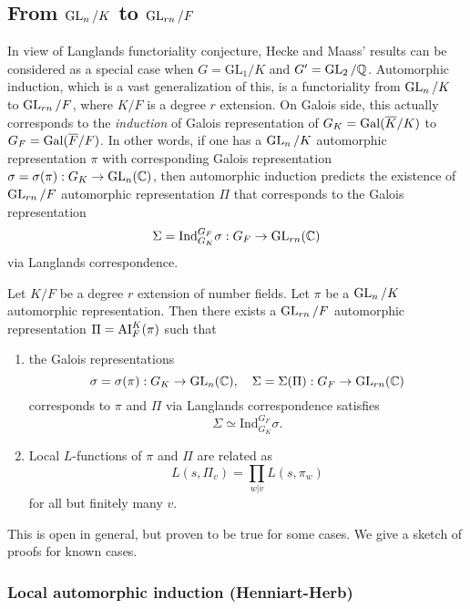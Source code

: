 \subsection{From $\operatorname{\mathrm{GL}}_{n}/K$ to $\operatorname{\mathrm{GL}}_{rn}/F$}
In view of Langlands functoriality conjecture, Hecke and Maass' results can be considered as a special case when $G = \mathrm{GL}_{1} / K$ and $G' = \operatorname{\mathrm{GL}}_{2}/\mathbb{Q}$. 
Automorphic induction, which is a vast generalization of this, is a functoriality from $\operatorname{\mathrm{GL}}_{n}/K$ to $\operatorname{\mathrm{GL}}_{rn}/F$, where $K/F$ is a degree $r$ extension.
On Galois side, this actually corresponds to the \emph{induction} of Galois representation of $G_{K} = \operatorname{\mathrm{Gal}}(\overline{K}/K)$ to $G_{F} = \operatorname{\mathrm{Gal}}(\overline{F}/F)$.
In other words, if one has a $\operatorname{\mathrm{GL}}_{n}/K$ automorphic representation $\pi$ with corresponding Galois representation $\sigma = \sigma(\pi): G_{K} \to \operatorname{\mathrm{GL}}_{n}(\mathbb{C})$, 
then automorphic induction predicts the existence of $\operatorname{\mathrm{GL}}_{rn}/F$ automorphic representation $\Pi$ that corresponds to the Galois representation
$$
\Sigma = \mathrm{Ind}_{G_{K}}^{G_{F}} \sigma : G_{F} \to \operatorname{\mathrm{GL}}_{rn}(\mathbb{C})
$$
via Langlands correspondence.

\begin{conjecture}
Let $K/F$ be a degree $r$ extension of number fields. 
Let $\pi$ be a $\operatorname{\mathrm{GL}}_{n}/K$ automorphic representation. 
Then there exists a $\operatorname{\mathrm{GL}}_{rn}/F$ automorphic representation $\Pi = \operatorname{\mathrm{AI}}_{F}^{K}(\pi)$ such that 
\begin{enumerate}
    \item the Galois representations 
    $$
    \sigma = \sigma(\pi): G_{K} \to \operatorname{\mathrm{GL}}_{n}(\mathbb{C}), \quad \Sigma = \Sigma(\Pi): G_{F} \to \operatorname{\mathrm{GL}}_{rn}(\mathbb{C})
    $$
    corresponds to $\pi$ and $\Pi$ via Langlands correspondence satisfies 
    $$
    \Sigma \simeq \mathrm{Ind}_{G_{K}}^{G_{F}} \sigma.
    $$
    \item Local $L$-functions of $\pi$ and $\Pi$ are related as
    $$
    L(s, \Pi_{v}) = \prod_{w|v} L(s, \pi_{w})
    $$
    for all but finitely many $v$. 
\end{enumerate}
\end{conjecture}

This is open in general, but proven to be true for some cases.
We give a sketch of proofs for known cases.

\subsubsection{Local automorphic induction (Henniart-Herb)}

